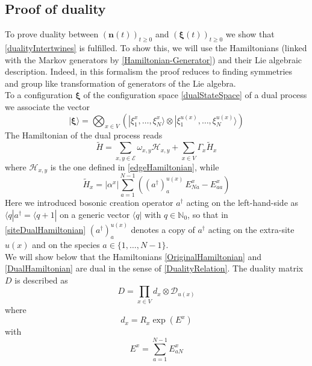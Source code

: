 \documentclass[10pt]{article}
\numberwithin{equation}{section}
\numberwithin{equation}{subsection}
\newcommand{\dd}{\mathcal{D}_{u(x)}}
\begin{document}
\subsection{Proof of duality}
To prove duality between $(\bm{n}(t))_{t\geq 0}$ and $(\bm{\xi}(t))_{t\geq 0}$ we  show that \eqref{dualityIntertwines} is fulfilled.  To show this, we will use the Hamiltonians (linked with the Markov generators by \eqref{Hamiltonian-Generator}) and their Lie algebraic description. Indeed, in this formalism the proof reduces to finding symmetries and group like transformation of generators of the Lie algebra.\\
To a configuration $\bm{\xi}$ of the configuration space  \eqref{dualStateSpace} of a dual process we associate the vector
\begin{equation}
    |\bm{\xi}\rangle=\bigotimes_{x\in V}\left(|\xi_{1}^{x},\ldots,\xi_{N}^{x}\rangle\otimes |\xi_{1}^{u(x)},\ldots,\xi_{N}^{u(x)}\rangle\right)
\end{equation}
The Hamiltonian of the dual process reads
\begin{equation}\label{DualHamiltonian}
    \widetilde{H}=\sum_{x,y\in \mathcal{E}}\omega_{x,y}\mathcal{H}_{x,y}+\sum_{x\in V}\Gamma_{x}\widetilde{H}_{x}
\end{equation}
where $\mathcal{H}_{x,y}$ is the one defined in \eqref{edgeHamiltonian}, while 
\begin{equation}\label{siteDualHamiltonian}
    \widetilde{H}_{x}=|\alpha^{x}|\sum_{a=1}^{N-1}\left((a^{\dagger})_{a}^{u(x)}\,E_{Na}^{x}-E_{aa}^{x}\right)
\end{equation}
Here we introduced bosonic creation operator $a^{\dagger}$ acting on the left-hand-side as $\langle q|a^{\dagger}=\langle q+1|$ on a generic vector $\langle q|$ with $q\in \mathbb{N}_{0}$, so that in \eqref{siteDualHamiltonian} 
$(a^{\dagger})_{a}^{u(x)}$ denotes a copy of $a^{\dagger}$ acting on the extra-site $u(x)$ and on the species $a\in\{1,\ldots,N-1\}$. \\
We will show below that the Hamiltonians \eqref{OriginalHamiltonian} and \eqref{DualHamiltonian} are dual in the sense of \eqref{DualityRelation}. The duality matrix $D$ is described as 
\begin{equation}\label{dualityMatrix}
    D=\prod_{x\in V}d_{x}\otimes \dd
\end{equation}
where
\begin{equation}\label{bulkElementDualityMatrix}
d_{x}=R_{x}\exp{(E^{x})}
\end{equation}
with 
\begin{equation}\label{EquationEx}
E^{x}=\sum_{a=1}^{N-1}E_{aN}^{x}
\end{equation}
\end{document}
